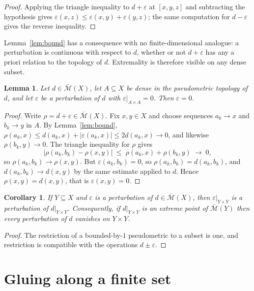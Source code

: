 \documentclass[11pt]{article}
\newtheorem{lemma}[theorem]{Lemma}
\newtheorem{corollary}[theorem]{Corollary}
\theoremstyle{definition}
\theoremstyle{remark}
\newcommand{\bM}{\bar{\mathcal{M}}}
\newcommand{\eps}{\varepsilon}
\begin{document}
\begin{proof}
Applying the triangle inequality to $d+\eps$ at $[x,y,z]$ and subtracting the hypothesis
gives $\eps(x,z)\le\eps(x,y)+\eps(y,z)$; the same computation for $d-\eps$ gives the
reverse inequality.
\end{proof}

Lemma~\ref{lem:bound} has a consequence with no finite-dimensional analogue: a perturbation
is continuous with respect to $d$, whether or not $d+\eps$ has any a priori relation to the
topology of $d$. Extremality is therefore visible on any dense subset.

\begin{lemma}\label{lem:dense}
Let $d\in\bM(X)$, let $A\subseteq X$ be dense in the pseudometric topology of $d$, and let
$\eps$ be a perturbation of $d$ with $\eps|_{A\times A}=0$. Then $\eps=0$.
\end{lemma}

\begin{proof}
Write $\rho=d+\eps\in\bM(X)$. Fix $x,y\in X$ and choose sequences $a_k\to x$ and $b_k\to y$
in $A$. By Lemma~\ref{lem:bound}, $\rho(a_k,x)\le d(a_k,x)+|\eps(a_k,x)|\le 2d(a_k,x)\to0$,
and likewise $\rho(b_k,y)\to 0$. The triangle inequality for $\rho$ gives
\[
|\rho(a_k,b_k)-\rho(x,y)|\;\le\;\rho(a_k,x)+\rho(b_k,y)\;\longrightarrow\;0 ,
\]
so $\rho(a_k,b_k)\to\rho(x,y)$. But $\eps(a_k,b_k)=0$, so $\rho(a_k,b_k)=d(a_k,b_k)$, and
$d(a_k,b_k)\to d(x,y)$ by the same estimate applied to $d$. Hence $\rho(x,y)=d(x,y)$, that
is $\eps(x,y)=0$.
\end{proof}

\begin{corollary}\label{cor:restrict}
If $Y\subseteq X$ and $\eps$ is a perturbation of $d\in\bM(X)$, then $\eps|_{Y\times Y}$ is
a perturbation of $d|_{Y\times Y}$. Consequently, if $d|_{Y\times Y}$ is an extreme point of
$\bM(Y)$ then every perturbation of $d$ vanishes on $Y\times Y$.
\end{corollary}

\begin{proof}
The restriction of a bounded-by-$1$ pseudometric to a subset is one, and restriction is
compatible with the operations $d\pm\eps$.
\end{proof}

\section{Gluing along a finite set}
\label{sec:glue}
\end{document}
